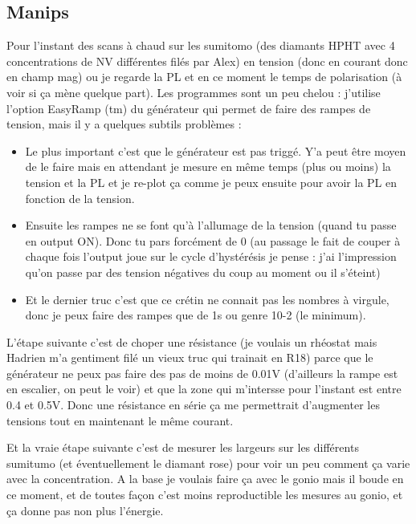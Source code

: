\documentclass[a4paper]{report}
\begin{document}
 \subsection{Manips}
 Pour l'instant des scans à chaud sur les sumitomo (des diamants HPHT avec 4 concentrations de NV différentes filés par Alex) en tension (donc en courant donc en champ mag) ou je regarde la PL et en ce moment le temps de polarisation (à voir si ça mène quelque part). Les programmes sont un peu chelou : j'utilise l'option EasyRamp (tm) du générateur qui permet de faire des rampes de tension, mais il y a quelques subtils problèmes :
 \begin{itemize}
 \item Le plus important c'est que le générateur est pas triggé. Y'a peut être moyen de le faire mais en attendant je mesure en même temps (plus ou moins) la tension et la PL et je re-plot ça comme je peux ensuite pour avoir la PL en fonction de la tension.
 \item Ensuite les rampes ne se font qu'à l'allumage de la tension (quand tu passe en output ON). Donc tu pars forcément de 0 (au passage le fait de couper à chaque fois l'output joue sur le cycle d’hystérésis je pense : j'ai l'impression qu'on passe par des tension négatives du coup au moment ou il s'éteint)
 \item Et le dernier truc c'est que ce crétin ne connait pas les nombres à virgule, donc je peux faire des rampes que de 1s ou genre 10-2 (le minimum).
 \end{itemize}
 
  L'étape suivante c'est de choper une résistance (je voulais un rhéostat mais Hadrien m'a gentiment filé un vieux truc qui trainait en R18) parce que le générateur ne peux pas faire des pas de moins de 0.01V (d'ailleurs la rampe est en escalier, on peut le voir) et que la zone qui m'intersse pour l'instant est entre 0.4 et 0.5V. Donc une résistance en série ça me permettrait d'augmenter les tensions tout en maintenant le même courant.
  
  Et la vraie étape suivante c'est de mesurer les largeurs sur les différents sumitumo (et éventuellement le diamant rose) pour voir un peu comment ça varie avec la concentration. A la base je voulais faire ça avec le gonio mais il boude en ce moment, et de toutes façon c'est moins reproductible les mesures au gonio, et ça donne pas non plus l'énergie.
  
\end{document}
